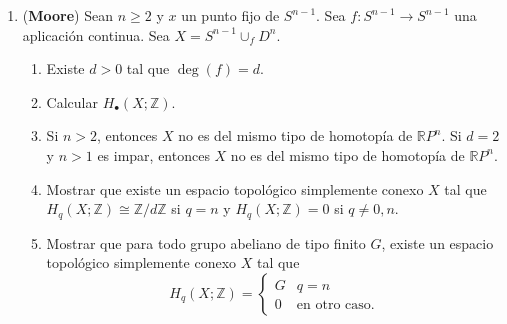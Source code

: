 \documentclass[11pt,a4paper]{article}
\theoremstyle{plain}
\theoremstyle{definition}
\theoremstyle{remark}
\newcommand{\RR}{\mathbb R}
\newcommand{\ZZ}{\mathbb Z}
\begin{document}
\begin{enumerate}[label=\arabic*.,leftmargin=*]
\item (\textbf{Moore}) Sean $n\ge2$ y $x$ un punto fijo de $S^{n-1}$. Sea
$f:S^{n-1}\to S^{n-1}$ una aplicación continua. Sea $X=S^{n-1}\cup_fD^n$.
\begin{enumerate}[label=\alph*)]
\item Existe $d>0$ tal que $\deg(f)=d$.
\item Calcular $H_\bullet(X;\ZZ)$.
\item Si $n>2$, entonces $X$ no es del mismo tipo de homotopía de
$\RR P^n$. Si $d=2$ y $n>1$ es impar, entonces $X$ no es del mismo tipo de
homotopía de $\RR P^n$.
\item Mostrar que existe un espacio topológico simplemente conexo $X$ tal
que $H_q(X;\ZZ)\cong\ZZ/d\ZZ$ si $q=n$ y $H_q(X;\ZZ)=0$ si $q\ne0,n$.
\item Mostrar que para todo grupo abeliano de tipo finito $G$, existe un
espacio topológico simplemente conexo $X$ tal que
\[
H_q(X;\ZZ)=\begin{cases}G & q=n\\0 & \text{en otro caso.}\end{cases}
\]
\end{enumerate}


\end{enumerate}
\end{document}

